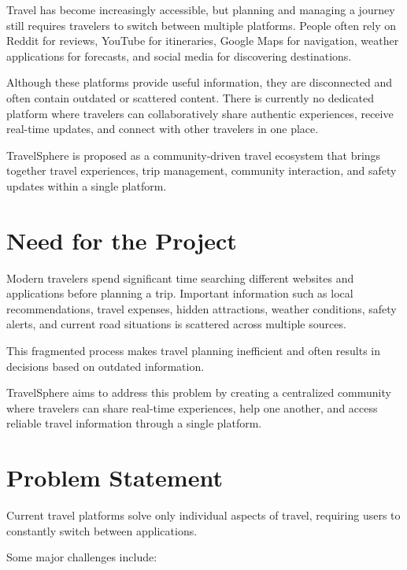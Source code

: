 \documentclass[12pt,a4paper]{article}
\begin{document}
Travel has become increasingly accessible, but planning and managing a journey still requires travelers to switch between multiple platforms. People often rely on Reddit for reviews, YouTube for itineraries, Google Maps for navigation, weather applications for forecasts, and social media for discovering destinations.

Although these platforms provide useful information, they are disconnected and often contain outdated or scattered content. There is currently no dedicated platform where travelers can collaboratively share authentic experiences, receive real-time updates, and connect with other travelers in one place.

TravelSphere is proposed as a community-driven travel ecosystem that brings together travel experiences, trip management, community interaction, and safety updates within a single platform.


\section{Need for the Project}

Modern travelers spend significant time searching different websites and applications before planning a trip. Important information such as local recommendations, travel expenses, hidden attractions, weather conditions, safety alerts, and current road situations is scattered across multiple sources.

This fragmented process makes travel planning inefficient and often results in decisions based on outdated information.

TravelSphere aims to address this problem by creating a centralized community where travelers can share real-time experiences, help one another, and access reliable travel information through a single platform.


\section{Problem Statement}

Current travel platforms solve only individual aspects of travel, requiring users to constantly switch between applications.

Some major challenges include:
\end{document}

